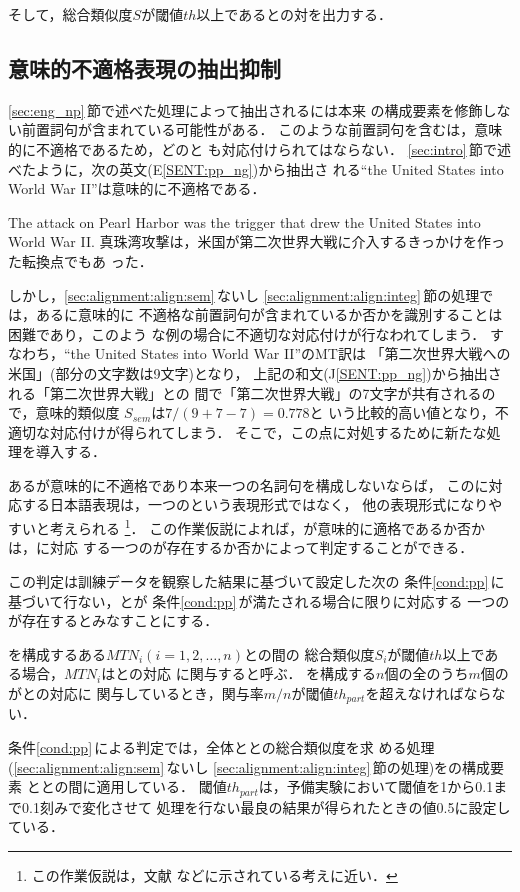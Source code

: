 そして，総合類似度$S$が閾値$th$以上である{\CPNP}と{\JNP}の対を出力する．


\subsection{意味的不適格表現の抽出抑制}
\label{sec:alignment:align:pp}

\ref{sec:eng_np}\,節で述べた処理によって抽出される{\CPNP}には本来
{\CPNP}の構成要素を修飾しない前置詞句が含まれている可能性がある．
このような前置詞句を含む{\CPNP}は，意味的に不適格であるため，どの{\JNP}と
も対応付けられてはならない．
\ref{sec:intro}\,節で述べたように，次の英文(E\ref{SENT:pp_ng})から抽出さ
れる``the United States into World War II''は意味的に不適格である．
\begin{SENT2}
\sentE
The attack on Pearl Harbor was the trigger that drew the United States 
into World War II.
\sentJ
真珠湾攻撃は，米国が第二次世界大戦に介入するきっかけを作った転換点でもあ
った．
\label{SENT:pp_ng}
\end{SENT2}
しかし，\ref{sec:alignment:align:sem}\,ないし
\ref{sec:alignment:align:integ}\,節の処理では，ある{\CPNP}に意味的に
不適格な前置詞句が含まれているか否かを識別することは困難であり，このよう
な例の場合に不適切な対応付けが行なわれてしまう． 
すなわち，``the United States into World War II''のMT訳は
「第二次世界大戦への米国」({\N}部分の文字数は9文字)となり，
上記の和文(J\ref{SENT:pp_ng})から抽出される{\JNP}「第二次世界大戦」との
間で「第二次世界大戦」の7文字が共有されるので，意味的類似度
$S_{sem}$は$7/(9+7-7) = 0.778$と
いう比較的高い値となり，不適切な対応付けが得られてしまう．
そこで，この点に対処するために新たな処理を導入する．

ある{\CPNP}が意味的に不適格であり本来一つの名詞句を構成しないならば，
この{\CPNP}に対応する日本語表現は，一つの{\JNP}という表現形式ではなく，
他の表現形式になりやすいと考えられる
\footnote{この作業仮説は，文献
\cite{Utsuro92,Kinoshita93}
などに示されている考えに近い．}．
この作業仮説によれば，{\CPNP}が意味的に適格であるか否かは，{\MTNP}に対応
する一つの{\JNP}が存在するか否かによって判定することができる．

この判定は訓練データを観察した結果に基づいて設定した次の
条件\ref{cond:pp}\,に基づいて行ない，{\MTNP}と{\JNP}が
条件\ref{cond:pp}\,が満たされる場合に限り{\MTNP}に対応する
一つの{\JNP}が存在するとみなすことにする．
\begin{COND}
\cond \label{cond:pp}
{\MTNP}を構成するある{\N}$MTN_i (i = 1, 2, \ldots, n)$と{\JNP}の間の
総合類似度$S_i$が閾値$th$以上である場合，$MTN_i$は{\CPNP}と{\JNP}の対応
に関与すると呼ぶ．
{\MTNP}を構成する$n$個の全{\N}のうち$m$個の{\N}が{\CPNP}と{\JNP}の対応に
関与しているとき，関与率$m/n$が閾値$th_{part}$を超えなければならない．
\end{COND}
条件\ref{cond:pp}\,による判定では，{\MTNP}全体と{\JNP}との総合類似度を求
める処理(\ref{sec:alignment:align:sem}\,ないし
\ref{sec:alignment:align:integ}\,節の処理)を{\MTNP}の構成要素
と{\JNP}との間に適用している．
閾値$th_{part}$は，予備実験において閾値を1から0.1まで0.1刻みで変化させて
処理を行ない最良の結果が得られたときの値0.5に設定している．


